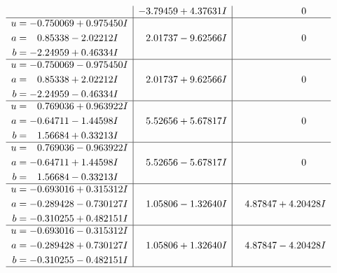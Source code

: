 \documentclass[1p]{elsarticle_modified}
\theoremstyle{definition}
\begin{document}
$$\begin{array}{c|c|c}
 & -3.79459 + 4.37631 I & \phantom{-0.000000 } 0 \\ \hline\begin{aligned}
u &= -0.750069 + 0.975450 I \\
a &= \phantom{-}0.85338 - 2.02212 I \\
b &= -2.24959 + 0.46334 I\end{aligned}
 & \phantom{-}2.01737 - 9.62566 I & \phantom{-0.000000 } 0 \\ \hline\begin{aligned}
u &= -0.750069 - 0.975450 I \\
a &= \phantom{-}0.85338 + 2.02212 I \\
b &= -2.24959 - 0.46334 I\end{aligned}
 & \phantom{-}2.01737 + 9.62566 I & \phantom{-0.000000 } 0 \\ \hline\begin{aligned}
u &= \phantom{-}0.769036 + 0.963922 I \\
a &= -0.64711 - 1.44598 I \\
b &= \phantom{-}1.56684 + 0.33213 I\end{aligned}
 & \phantom{-}5.52656 + 5.67817 I & \phantom{-0.000000 } 0 \\ \hline\begin{aligned}
u &= \phantom{-}0.769036 - 0.963922 I \\
a &= -0.64711 + 1.44598 I \\
b &= \phantom{-}1.56684 - 0.33213 I\end{aligned}
 & \phantom{-}5.52656 - 5.67817 I & \phantom{-0.000000 } 0 \\ \hline\begin{aligned}
u &= -0.693016 + 0.315312 I \\
a &= -0.289428 - 0.730127 I \\
b &= -0.310255 + 0.482151 I\end{aligned}
 & \phantom{-}1.05806 - 1.32640 I & \phantom{-}4.87847 + 4.20428 I \\ \hline\begin{aligned}
u &= -0.693016 - 0.315312 I \\
a &= -0.289428 + 0.730127 I \\
b &= -0.310255 - 0.482151 I\end{aligned}
 & \phantom{-}1.05806 + 1.32640 I & \phantom{-}4.87847 - 4.20428 I\\
 \hline 
 \end{array}$$\newpage$$\begin{array}{c|c|c}  

\end{array}$$
\end{document}
